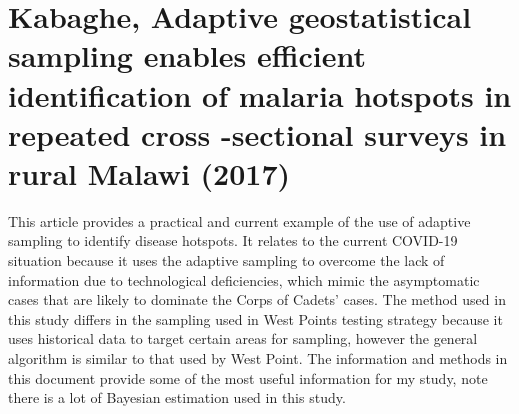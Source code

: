\documentclass{article}
\begin{document}
\section{Kabaghe, Adaptive geostatistical sampling enables efficient identification of malaria hotspots in repeated cross -sectional surveys in rural Malawi (2017)}
This article provides a practical and current example of the use of adaptive sampling to identify disease hotspots. \cite{kabaghe2017adaptive} It relates to the current COVID-19 situation because it uses the adaptive sampling to overcome the lack of information due to technological deficiencies, which mimic the asymptomatic cases that are likely to dominate the Corps of Cadets' cases.  The method used in this study differs in the sampling used in West Points testing strategy because it uses historical data to target certain areas for sampling, however the general algorithm is similar to that used by West Point. The information and methods in this document provide some of the most useful information for my study, note there is a lot of Bayesian estimation used in this study. 





\clearpage


\end{document}

